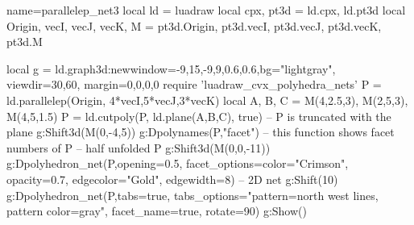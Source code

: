\begin{luadraw}{name=parallelep_net3}
local ld = luadraw
local cpx, pt3d = ld.cpx, ld.pt3d
local Origin, vecI, vecJ, vecK, M = pt3d.Origin, pt3d.vecI, pt3d.vecJ, pt3d.vecK, pt3d.M

local g = ld.graph3d:new{window={-9,15,-9,9,0.6,0.6},bg="lightgray", viewdir={30,60}, margin={0,0,0,0}} 
require 'luadraw_cvx_polyhedra_nets'
P = ld.parallelep(Origin, 4*vecI,5*vecJ,3*vecK)
local A, B, C = M(4,2.5,3), M(2,5,3), M(4,5,1.5)
P = ld.cutpoly(P, ld.plane(A,B,C), true) -- P is truncated with the plane
g:Shift3d(M(0,-4,5))
g:Dpolynames(P,"facet") -- this function shows facet numbers of P
-- half unfolded P
g:Shift3d(M(0,0,-11))
g:Dpolyhedron_net(P,{opening=0.5, facet_options={color="Crimson", opacity=0.7, edgecolor="Gold", edgewidth=8}})
-- 2D net
g:Shift(10)
g:Dpolyhedron_net(P,{tabs=true, tabs_options="pattern=north west lines, pattern color=gray", 
 facet_name=true, rotate=90})
g:Show()
\end{luadraw}
